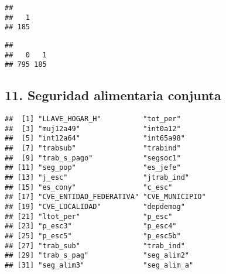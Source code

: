 \documentclass[11pt,]{article}
\newenvironment{Shaded}{\begin{snugshade}}{\end{snugshade}}
\newcommand{\KeywordTok}[1]{\textcolor[rgb]{0.13,0.29,0.53}{\textbf{#1}}}
\newcommand{\DecValTok}[1]{\textcolor[rgb]{0.00,0.00,0.81}{#1}}
\newcommand{\StringTok}[1]{\textcolor[rgb]{0.31,0.60,0.02}{#1}}
\newcommand{\CommentTok}[1]{\textcolor[rgb]{0.56,0.35,0.01}{\textit{#1}}}
\newcommand{\OperatorTok}[1]{\textcolor[rgb]{0.81,0.36,0.00}{\textbf{#1}}}
\newcommand{\NormalTok}[1]{#1}
\begin{document}
\begin{Shaded}
\end{Shaded}

\begin{verbatim}
## 
##   1 
## 185
\end{verbatim}

\begin{Shaded}
\end{Shaded}

\begin{verbatim}
## 
##   0   1 
## 795 185
\end{verbatim}

\subsection{11. Seguridad alimentaria
conjunta}\label{seguridad-alimentaria-conjunta}

\begin{Shaded}
\end{Shaded}

\begin{verbatim}
##  [1] "LLAVE_HOGAR_H"          "tot_per"               
##  [3] "muj12a49"               "int0a12"               
##  [5] "int12a64"               "int65a98"              
##  [7] "trabsub"                "trabind"               
##  [9] "trab_s_pago"            "segsoc1"               
## [11] "seg_pop"                "es_jefe"               
## [13] "j_esc"                  "jtrab_ind"             
## [15] "es_cony"                "c_esc"                 
## [17] "CVE_ENTIDAD_FEDERATIVA" "CVE_MUNICIPIO"         
## [19] "CVE_LOCALIDAD"          "depdemog"              
## [21] "ltot_per"               "p_esc"                 
## [23] "p_esc3"                 "p_esc4"                
## [25] "p_esc5"                 "p_esc5b"               
## [27] "trab_sub"               "trab_ind"              
## [29] "trab_s_pag"             "seg_alim2"             
## [31] "seg_alim3"              "seg_alim_a"
\end{verbatim}
\end{document}
